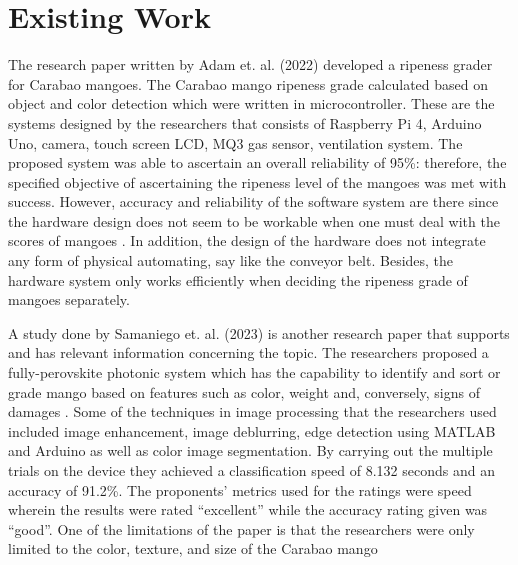 

\section{Existing Work}

The research paper written by Adam et. al. (2022) developed a ripeness grader for
Carabao mangoes. The Carabao mango ripeness grade calculated based on object and
color detection which were written in microcontroller. These are the systems designed
by the researchers that consists of Raspberry Pi 4, Arduino Uno, camera, touch screen
LCD, MQ3 gas sensor, ventilation system. The proposed system was able to ascertain an
overall reliability of 95\%: therefore, the specified objective of ascertaining the ripeness
level of the mangoes was met with success. However, accuracy and reliability of the
software system are there since the hardware design does not seem to be workable when
one must deal with the scores of mangoes \cite{adam-non-destructive-2022}. In addition, the design of the hardware does
not integrate any form of physical automating, say like the conveyor belt. Besides, the
hardware system only works efficiently when deciding the ripeness grade of mangoes
separately.

A study done by Samaniego et. al. (2023) is another research paper that supports and has
relevant information concerning the topic. The researchers proposed a fully-perovskite
photonic system which has the capability to identify and sort or grade mango based on
features such as color, weight and, conversely, signs of damages \cite{school-of-engineering-asia-pacific-college-philippines-carabao-2023}. Some of the techniques
in image processing that the researchers used included image enhancement, image
deblurring, edge detection using MATLAB and Arduino as well as color image
segmentation. By carrying out the multiple trials on the device they achieved a
classification speed of 8.132 seconds and an accuracy of 91.2\%. The proponents’
metrics used for the ratings were speed wherein the results were rated “excellent” while
the accuracy rating given was “good”. One of the limitations of the paper is that the
researchers were only limited to the color, texture, and size of the Carabao mango

